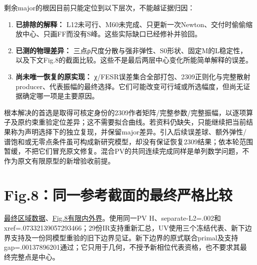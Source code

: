 \documentclass[
  10pt,
  a4paper,
]{article}
\providecommand{\tightlist}{%
  \setlength{\itemsep}{0pt}\setlength{\parskip}{0pt}}
\begin{document}
剩余major的根因目前只能定位到以下层次，不能越证据归因：

\begin{enumerate}
\def\labelenumi{\arabic{enumi}.}
\tightlist
\item
  \textbf{已排除的解释：}
  L12未可行、M60未完成、只更新一次Newton、交付时偷偷缩放中心、只画FF而没有S峰。这些实际缺口已经修补并验回。
\item
  \textbf{已测的物理差异：}
  三点ρ尺度分散与强非弹性、S0形状、固定M的L稳定性，以及下文Fig.8的截面比较。这些不是最后两层中心变化所能简单解释的误差。
\item
  \textbf{尚未唯一恢复的原实现：}
  χ/FESR误差集合全部打包、2309正则化与完整散射producer、代表振幅的最终选择。它们可能改变可行域或所选幅度，但尚无证据确定哪一项是主要原因。
\end{enumerate}

根本解决的首选是取得可核定身份的2309作者矩阵/完整参数/完整振幅，以逐项算子及原约束重验定位差异；这不需要拟合曲线。若资料仍缺失，只能继续把当前结果称为声明选择下的独立复现，并保留major差异。引入后续误差球、额外弹性/谱饱和或无零点条件虽可构成新研究模型，却没有保证恢复2309结果；依本轮范围暂缓，不把它们冒充原文修复。混合PV的共同连续完成同样是单列数学问题，不作为原文有限原型的新增验收前提。

\section{Fig.8：同一参考截面的最终严格比较}\label{fig.8ux540cux4e00ux53c2ux8003ux622aux9762ux7684ux6700ux7ec8ux4e25ux683cux6bd4ux8f83}

\href{../PV_E1_regions_complete/regions.json}{最终区域数据}、\href{../PV_E1_regions_complete/regions.pdf}{Fig.8有限内外界}。使用同一PV
H、separate-L2=.002和xref=.07332139057293466；29份IR支持重新汇总，UV使用三个冻结代表、新下边界支持及一份同模型重验的旧下边界见证。新下边界的原式联合primal及支持gap=.00137896201通过；它只用于几何，不授予新相位代表资格，也不要求其最终完整点是中心。
\end{document}
